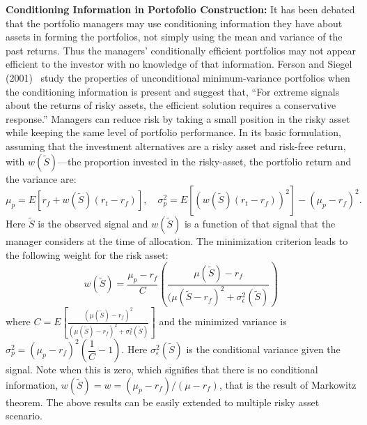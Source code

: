 \noindent\textbf{Conditioning Information in Portofolio Construction:} It has been debated that the portfolio managers may use conditioning information they have about assets in forming the portfolios, not simply using the mean and variance of the past returns. Thus the managers' conditionally efficient portfolios may not appear efficient to the investor with no knowledge of that information. Ferson and Siegel (2001)~\cite{fersie} study the properties of unconditional minimum-variance portfolios when the conditioning information is present and suggest that, ``For extreme signals about the returns of risky assets, the efficient solution requires a conservative response.'' Managers can reduce risk by taking a small position in the risky asset while keeping the same level of portfolio performance. In its basic formulation, assuming that the investment alternatives are a risky asset and risk-free return, with $w(\tilde{S})$---the proportion invested in the risky-asset, the portfolio return and the variance are: 
	\begin{equation} \label{eqn:preturnvar}
	\mu_p= E[r_f+w(\tilde{S})(r_t-r_f)], \quad \sigma_p^2= E[(w(\tilde{S})(r_t - r_f))^2] - (\mu_p - r_f)^2.
	\end{equation}
Here $\tilde{S}$ is the observed signal and $w(\tilde{S})$ is a function of that signal that the manager considers at the time of allocation. The minimization criterion leads to the following weight for the risk asset:
	\begin{equation}\label{eqn:riskyassetweight}
	w(\tilde{S})= \dfrac{\mu_p - r_f}{C} \left( \dfrac{\mu(\tilde{S}) - r_f}{(\mu(\tilde{S} - r_f)^2 + \sigma^2_\epsilon(\tilde{S})} \right)
	\end{equation}
where ${C= E\left[ \frac{(\mu(\tilde{S}) - r_f)^2}{(\mu(\tilde{S}) - r_f)^2 + \sigma^2_\epsilon(\tilde{S})} \right]}$ and the minimized variance is ${\sigma_p^2=(\mu_p-r_f)^2\left(\dfrac{1}{C} - 1\right)}$. Here $\sigma_\epsilon^2(\tilde{S})$ is the conditional variance given the signal. Note when this is zero, which signifies that there is no conditional information, $w(\tilde{S})=w=(\mu_p-r_f)/(\mu-r_f)$, that is the result of Markowitz theorem. The above results can be easily extended to multiple risky asset scenario.


